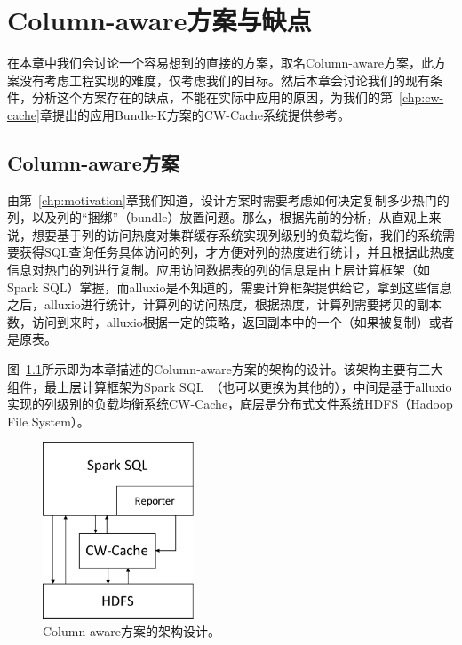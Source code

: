 \chapter{Column-aware方案与缺点}
\label{chp:column-aware}

\par 在本章中我们会讨论一个容易想到的直接的方案，取名Column-aware方案，此方案没有考虑工程实现的难度，仅考虑我们的目标。然后本章会讨论我们的现有条件，分析这个方案存在的缺点，不能在实际中应用的原因，为我们的第~\ref{chp:cw-cache}章提出的应用Bundle-K方案的CW-Cache系统提供参考。

\section{Column-aware方案}

\par 由第~\ref{chp:motivation}章我们知道，设计方案时需要考虑如何决定复制多少热门的列，以及列的“捆绑”（bundle）放置问题。那么，根据先前的分析，从直观上来说，想要基于列的访问热度对集群缓存系统实现列级别的负载均衡，我们的系统需要获得SQL查询任务具体访问的列，才方便对列的热度进行统计，并且根据此热度信息对热门的列进行复制。应用访问数据表的列的信息是由上层计算框架（如Spark SQL）掌握，而alluxio是不知道的，需要计算框架提供给它，拿到这些信息之后，alluxio进行统计，计算列的访问热度，根据热度，计算列需要拷贝的副本数，访问到来时，alluxio根据一定的策略，返回副本中的一个（如果被复制）或者是原表。

\par 图~\ref{fig:sim-archi}所示即为本章描述的Column-aware方案的架构的设计。该架构主要有三大组件，最上层计算框架为Spark SQL~\cite{spark-sql}（也可以更换为其他的），中间是基于alluxio\cite{alluxio}实现的列级别的负载均衡系统CW-Cache，底层是分布式文件系统HDFS（Hadoop File System）\cite{hdfs}。

\begin{figure}[]
	\centering
	\includegraphics[width=0.4\textwidth]{img/column-aware/sim-archi}
	
	\caption{Column-aware方案的架构设计。}
	\label{fig:sim-archi}
\end{figure}

